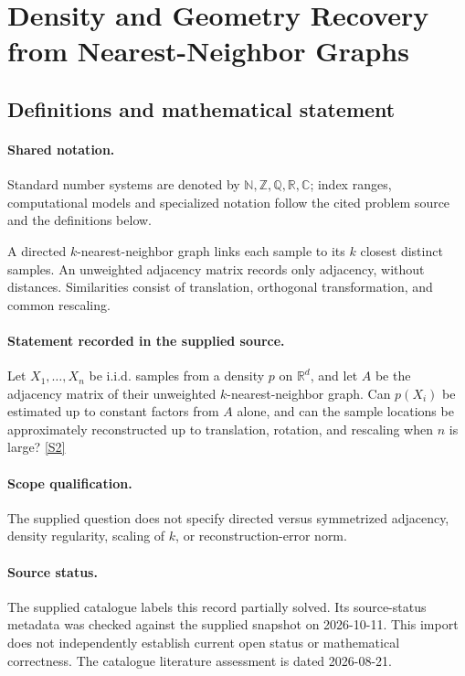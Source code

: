 \documentclass[11pt]{article}
\newcommand{\sref}[2]{\hyperlink{source:#1:#2}{[S#2]}}
\begin{document}
\section{Density and Geometry Recovery from Nearest-Neighbor Graphs}\label{statement}

\subsection{Definitions and mathematical statement}

\paragraph{Shared notation.}Standard number systems are denoted by $\mathbb N,\mathbb Z,\mathbb Q,\mathbb R,\mathbb C$; index ranges, computational models and specialized notation follow the cited problem source and the definitions below.


A directed $k$-nearest-neighbor graph links each sample to its $k$ closest distinct samples. An unweighted adjacency matrix records only adjacency, without distances. Similarities consist of translation, orthogonal transformation, and common rescaling.
\paragraph{Statement recorded in the supplied source.}
Let $X_1,\ldots,X_n$ be i.i.d. samples from a density $p$ on $\mathbb R^d$, and let $A$ be the adjacency matrix of their unweighted $k$-nearest-neighbor graph. Can $p(X_i)$ be estimated up to constant factors from $A$ alone, and can the sample locations be approximately reconstructed up to translation, rotation, and rescaling when $n$ is large? \sref{statement}{2}
\paragraph{Scope qualification.}
The supplied question does not specify directed versus symmetrized adjacency, density regularity, scaling of $k$, or reconstruction-error norm.
\paragraph{Source status.}
The supplied catalogue labels this record partially solved. Its source-status metadata was checked against the supplied snapshot on 2026-10-11. This import does not independently establish current open status or mathematical correctness. The catalogue literature assessment is dated 2026-08-21.
\end{document}
